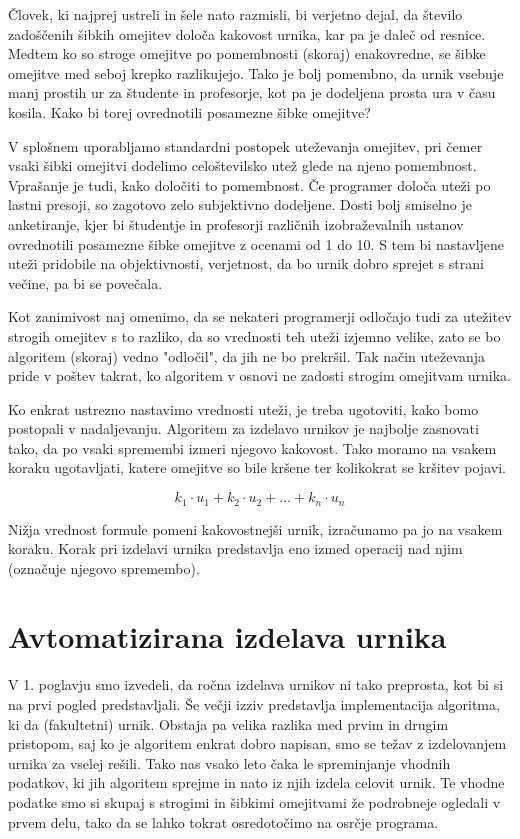 \documentclass[a4paper,10pt]{article}
\begin{document}
Človek, ki najprej ustreli in šele nato razmisli, bi verjetno dejal, da število zadoščenih šibkih omejitev določa kakovost urnika, kar pa je daleč od resnice. Medtem ko so stroge omejitve po pomembnosti (skoraj) enakovredne, se šibke omejitve med seboj krepko razlikujejo. Tako je bolj pomembno, da urnik vsebuje manj prostih ur za študente in profesorje, kot pa je dodeljena prosta ura v času kosila. Kako bi torej ovrednotili posamezne šibke omejitve?

V splošnem uporabljamo standardni postopek uteževanja omejitev, pri čemer vsaki šibki omejitvi dodelimo celoštevilsko utež glede na njeno pomembnost. Vprašanje je tudi, kako določiti to pomembnost. Če programer določa uteži po lastni presoji, so zagotovo zelo subjektivno dodeljene. Dosti bolj smiselno je anketiranje, kjer bi študentje in profesorji različnih izobraževalnih ustanov ovrednotili posamezne šibke omejitve z ocenami od 1 do 10. S tem bi nastavljene uteži pridobile na objektivnosti, verjetnost, da bo urnik dobro sprejet s strani večine, pa bi se povečala.

Kot zanimivost naj omenimo, da se nekateri programerji odločajo tudi za utežitev strogih omejitev s to razliko, da so vrednosti teh uteži izjemno velike, zato se bo algoritem (skoraj) vedno "odločil", da jih ne bo prekršil. Tak način uteževanja pride v poštev takrat, ko algoritem v osnovi ne zadosti strogim omejitvam urnika.

Ko enkrat ustrezno nastavimo vrednosti uteži, je treba ugotoviti, kako bomo postopali v nadaljevanju. Algoritem za izdelavo urnikov je najbolje zasnovati tako, da po vsaki spremembi izmeri njegovo kakovost. Tako moramo na vsakem koraku ugotavljati, katere omejitve so bile kršene ter kolikokrat se kršitev pojavi.

\[
k_1 \cdot u_1 + k_2 \cdot u_2 + \dots + k_n \cdot u_n
\]

Nižja vrednost formule pomeni kakovostnejši urnik, izračunamo pa jo na vsakem koraku. Korak pri izdelavi urnika predstavlja eno izmed operacij nad njim (označuje njegovo spremembo).
\section{Avtomatizirana izdelava urnika}
V 1. poglavju smo izvedeli, da ročna izdelava urnikov ni tako preprosta, kot bi si na prvi pogled predstavljali. Še večji izziv predstavlja implementacija algoritma, ki da (fakultetni) urnik. Obstaja pa velika razlika med prvim in drugim pristopom, saj ko je algoritem enkrat dobro napisan, smo se težav z izdelovanjem urnika za vselej rešili. Tako nas vsako leto čaka le spreminjanje vhodnih podatkov, ki jih algoritem sprejme in nato iz njih izdela celovit urnik. Te vhodne podatke smo si skupaj s strogimi in šibkimi omejitvami že podrobneje ogledali v prvem delu, tako da se lahko tokrat osredotočimo na osrčje programa.
\end{document}
